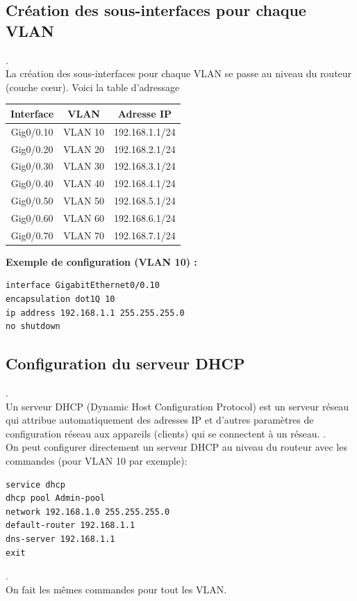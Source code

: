 \documentclass[a4paper,12pt]{article}
\begin{document}
\subsection{Création des sous-interfaces pour chaque VLAN}
.\\
La création des sous-interfaces pour chaque VLAN se passe au niveau du routeur (couche
cœur). Voici la table d'adressage
\begin{center}
\begin{tabular}{|c|c|c|}
\hline
Interface & VLAN & Adresse IP \\
\hline
Gig0/0.10 & VLAN 10 & 192.168.1.1/24 \\
Gig0/0.20 & VLAN 20 & 192.168.2.1/24 \\
Gig0/0.30 & VLAN 30 & 192.168.3.1/24 \\
Gig0/0.40 & VLAN 40 & 192.168.4.1/24 \\
Gig0/0.50 & VLAN 50 & 192.168.5.1/24 \\
Gig0/0.60 & VLAN 60 & 192.168.6.1/24 \\
Gig0/0.70 & VLAN 70 & 192.168.7.1/24 \\
\hline
\end{tabular}
\end{center}

\textbf{Exemple de configuration (VLAN 10) :}
\begin{verbatim}
interface GigabitEthernet0/0.10
encapsulation dot1Q 10
ip address 192.168.1.1 255.255.255.0
no shutdown
\end{verbatim}

\subsection{Configuration du serveur DHCP}
.\\Un serveur DHCP (Dynamic Host Configuration Protocol) est un serveur réseau qui attribue
automatiquement des adresses IP et d’autres paramètres de configuration réseau aux appareils
(clients) qui se connectent à un réseau.
.\\On peut configurer directement un serveur DHCP au niveau du routeur avec les commandes (pour VLAN 10 par exemple):
\begin{verbatim}
service dhcp
dhcp pool Admin-pool
network 192.168.1.0 255.255.255.0
default-router 192.168.1.1
dns-server 192.168.1.1
exit
\end{verbatim}
.\\On fait les mêmes commandes pour tout les VLAN.\\
\end{document}
